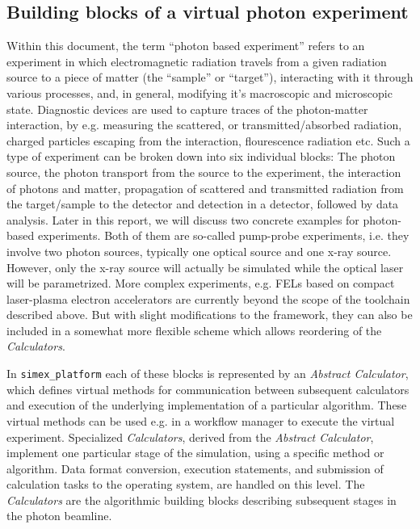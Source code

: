 \documentclass[a4paper]{article}
\begin{document}
\subsection{Building blocks of a virtual photon experiment}
Within this document, the term ``photon based experiment'' refers to an experiment in which electromagnetic radiation travels
from a given radiation source to a piece of matter (the ``sample'' or ``target''), interacting with it through various
processes, and, in general, modifying it's macroscopic and microscopic state. Diagnostic devices are used to capture traces of
the photon-matter interaction, by e.g. measuring the scattered, or transmitted/absorbed radiation,
charged particles escaping from the interaction, flourescence radiation etc.
Such a type of experiment can be broken down into six individual blocks: The photon source, the photon transport
from the source to the experiment, the interaction of photons and matter, propagation of scattered and transmitted radiation from the
target/sample to the detector and detection in a detector, followed by data analysis. Later in this report, we will discuss two
concrete examples for photon-based experiments. Both of them are so-called pump-probe experiments, i.e. they involve two photon
sources, typically one optical source and one x-ray source. However, only the x-ray source will actually be simulated while the
optical laser will be parametrized. More complex experiments, e.g. FELs based on compact
laser-plasma electron accelerators are currently beyond the scope of the toolchain described above. But with slight
modifications to the framework, they can also be included in a somewhat more
flexible scheme which allows reordering of the \textit{Calculators}.

In \texttt{simex\_platform} each of these blocks is
represented by an \textit{Abstract Calculator}, which defines virtual methods for communication between subsequent calculators and execution of
the underlying implementation of a particular algorithm.
These virtual methods can be used e.g. in a workflow manager to execute the virtual experiment.
Specialized \textit{Calculators}, derived from the \textit{Abstract Calculator}, implement one particular stage of the simulation, using a
specific method or algorithm. Data
format conversion, execution statements, and submission of calculation tasks to the operating system, are handled on this
level. The
\textit{Calculators} are the algorithmic building blocks describing subsequent stages in the photon beamline.
%
\end{document}
